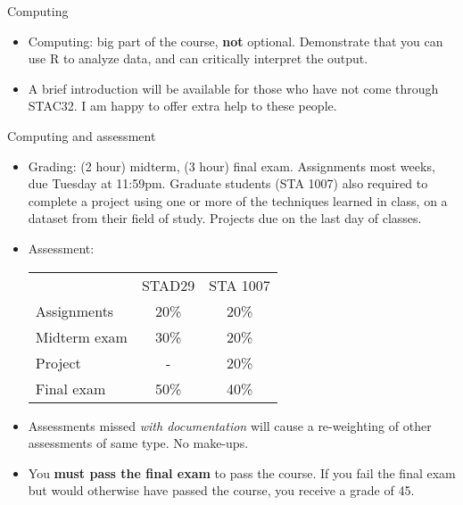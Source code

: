 \begin{frame}[fragile]{Computing}

  \begin{itemize}
  \item Computing: big part of the course, {\bf not}
    optional. Demonstrate that you can use 
    R to analyze data, and can
    critically interpret the output.
  \item A brief introduction will be available
    for those who have not come through STAC32. I am happy to offer
    extra help to these people.
  \end{itemize}
  
\end{frame}


\begin{frame}{Computing and assessment}
\begin{itemize}
\item Grading: (2 hour) midterm, (3 hour) final exam. Assignments most
  weeks, due Tuesday at 11:59pm. 
  Graduate students (STA 1007) also required to
  complete a project using one or more of the techniques learned in
  class, on a dataset from their field of study.    Projects due on
  the last day of classes.

\item Assessment:

  \begin{tabular}{lcc}
    & STAD29 & STA 1007\\
    Assignments & 20\% & 20\%\\
    Midterm exam & 30\%  & 20\% \\
    Project & - & 20\%\\
    Final exam & 50\% & 40\%
  \end{tabular}

\item Assessments missed \emph{with documentation} will cause a
  re-weighting of other assessments of same type. No make-ups.
\item You \textbf{must pass the final exam} to pass the course. If you
  fail the final exam but would otherwise have passed the course, you
  receive a grade of 45.

\end{itemize}
\end{frame}

